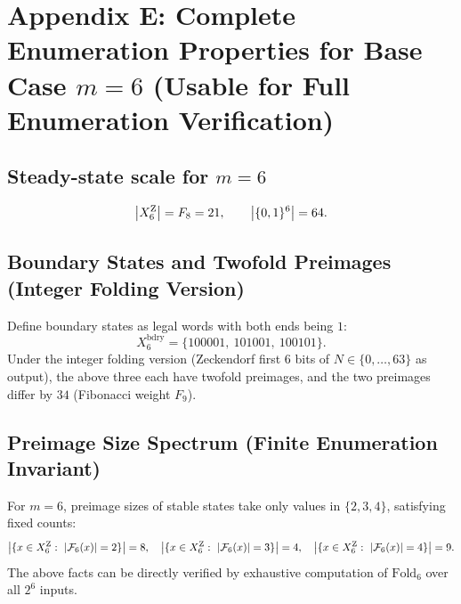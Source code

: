 \section{Appendix E: Complete Enumeration Properties for Base Case \texorpdfstring{$m=6$}{m=6} (Usable for Full Enumeration Verification)}
\label{app:m6-enum}

\subsection{\texorpdfstring{Steady-state scale for $m=6$}{Steady-state scale for m=6}}

\[
\left\lvert X_6^{\mathrm Z}\right\rvert=F_8=21,\qquad \left\lvert \{0,1\}^6\right\rvert=64.
\]

\subsection{Boundary States and Twofold Preimages (Integer Folding Version)}

Define boundary states as legal words with both ends being $1$:
\[
X^{\mathrm{bdry}}_6=\{100001,\ 101001,\ 100101\}.
\]
Under the integer folding version (Zeckendorf first 6 bits of $N\in\{0,\dots,63\}$ as output), the above three each have twofold preimages, and the two preimages differ by $34$ (Fibonacci weight $F_9$).

\subsection{Preimage Size Spectrum (Finite Enumeration Invariant)}

For $m=6$, preimage sizes of stable states take only values in $\{2,3,4\}$, satisfying fixed counts:
\[
\left\lvert \{x\in X_6^{\mathrm Z}:\ \left\lvert \mathcal{F}_6(x)\right\rvert=2\}\right\rvert=8,\quad
\left\lvert \{x\in X_6^{\mathrm Z}:\ \left\lvert \mathcal{F}_6(x)\right\rvert=3\}\right\rvert=4,\quad
\left\lvert \{x\in X_6^{\mathrm Z}:\ \left\lvert \mathcal{F}_6(x)\right\rvert=4\}\right\rvert=9.
\]
The above facts can be directly verified by exhaustive computation of $\mathrm{Fold}_6$ over all $2^6$ inputs.
